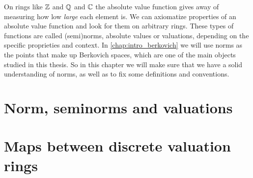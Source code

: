 On rings like $\mathbb{Z}$ and $\mathbb{Q}$ and $\mathbb{C}$ the absolute value function gives away of measuring how low \emph{large} each element is. 
We can axiomatize properties of an absolute value function and look for them on arbitrary rings. 
These types of functions are called (semi)norms, absolute values or valuations, depending on the specific proprieties and context.  
In \cref{chap:intro_berkovich} we will use norms as the points that make up Berkovich spaces, which are one of the main objects studied in this thesis. 
So in this chapter we will make sure that we have a solid understanding of norms, as well as to fix some definitions and conventions.


\section{Norm, seminorms and valuations} \label{sec:norm,_seminorms_and_valuations}


\section{Maps between discrete valuation rings} \label{sec:maps_between_discrete_valuation_rings}


